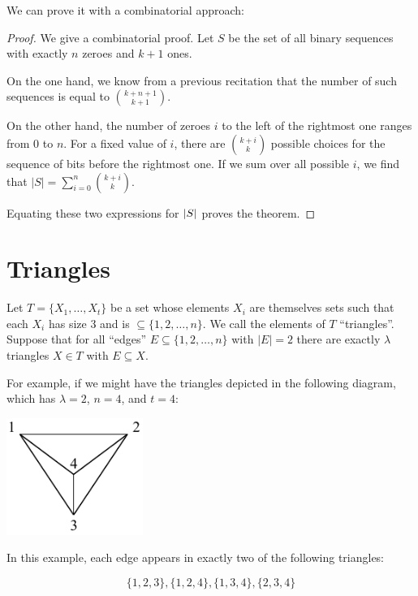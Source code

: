 \documentclass[12pt]{article}
\begin{document}
{We can prove it with a combinatorial approach:

\begin{proof}
We give a combinatorial proof.  Let $S$ be the set of all binary
sequences with exactly $n$ zeroes and $k + 1$ ones.

On the one hand, we know from a previous recitation that the number of
such sequences is equal to $\binom{k + n + 1}{k+1}$.

On the other hand, the number of zeroes $i$ to the left of the rightmost
one ranges from 0 to $n$.  For a fixed value of $i$, there are
$\binom{k + i}{k}$ possible choices for the sequence of bits before the
rightmost one.  If we sum over all possible $i$, we find that
$|S| = \sum_{i = 0}^n \binom{k + i}{k}$.

Equating these two expressions for $\left|S\right|$ proves the theorem.
\end{proof}
} %



\section{Triangles}
Let $T=\{X_1,\ldots, X_t\}$ be a set whose elements $X_i$ are themselves
sets such that each $X_i$ has size 3 and is $\subseteq \{1,2,\ldots, n\}$.
We call the elements of $T$ ``triangles''. Suppose that for all
``edges'' $E\subseteq \{1,2,\ldots, n\}$ with $|E|=2$ there are exactly
$\lambda$ triangles $X\in T$ with $E\subseteq X$.

For example, if we might have the triangles depicted in the following
diagram, which has $\lambda = 2$, $n = 4$, and $t = 4$:

\begin{center}
\includegraphics[height=1.5in]{triangles2}
\end{center}

In this example, each edge appears in exactly two of the following triangles:

$$\{1, 2, 3\}, \{1, 2, 4\}, \{1, 3, 4\}, \{2, 3, 4\}$$
\end{document}
